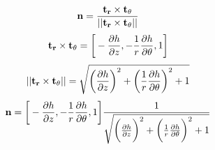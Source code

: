\documentclass{article}
\begin{document}
\begin{equation}
{\bf n} = \frac{ {\bf t_{r}} \times {\bf t_{\theta }}}{||{\bf t_{r}} \times {\bf t_{\theta }}||}
\end{equation}
\begin{equation}
{\bf t_{r}} \times {\bf t_{\theta }} = \bigg[-\frac{\partial h}{\partial z} , -\frac{1}{r}\frac{\partial h}{\partial \theta} ,1\bigg]
\end{equation}
\begin{equation}
||{\bf t_{r}} \times {\bf t_{\theta }}|| = \sqrt{\bigg(\frac{\partial h}{\partial z}\bigg)^2 + \bigg(\frac{1}{r}\frac{\partial h}{\partial \theta}\bigg)^2 + 1}
\end{equation}
\begin{equation}
{\bf n} = \bigg[-\frac{\partial h}{\partial z} , -\frac{1}{r}\frac{\partial h}{\partial \theta} ,1\bigg]\frac{1}{\sqrt{\bigg(\frac{\partial h}{\partial z}\bigg)^2 + \bigg(\frac{1}{r}\frac{\partial h}{\partial \theta}\bigg)^2 + 1}}
\end{equation}
\end{document}
